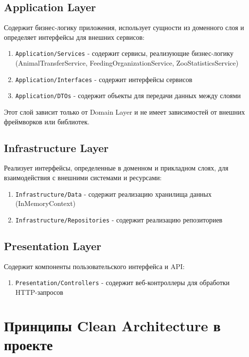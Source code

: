 \documentclass[a4paper,12pt]{article}
\begin{document}
\subsection{Application Layer}

Содержит бизнес-логику приложения, использует сущности из доменного слоя и определяет интерфейсы для внешних сервисов:

\begin{enumerate}
    \item \texttt{Application/Services} - содержит сервисы, реализующие бизнес-логику (AnimalTransferService, FeedingOrganizationService, ZooStatisticsService)
    \item \texttt{Application/Interfaces} - содержит интерфейсы сервисов
    \item \texttt{Application/DTOs} - содержит объекты для передачи данных между слоями
\end{enumerate}

Этот слой зависит только от Domain Layer и не имеет зависимостей от внешних фреймворков или библиотек.

\subsection{Infrastructure Layer}

Реализует интерфейсы, определенные в доменном и прикладном слоях, для взаимодействия с внешними системами и ресурсами:

\begin{enumerate}
    \item \texttt{Infrastructure/Data} - содержит реализацию хранилища данных (InMemoryContext)
    \item \texttt{Infrastructure/Repositories} - содержит реализацию репозиториев
\end{enumerate}

\subsection{Presentation Layer}

Содержит компоненты пользовательского интерфейса и API:

\begin{enumerate}
    \item \texttt{Presentation/Controllers} - содержит веб-контроллеры для обработки HTTP-запросов
\end{enumerate}

\section{Принципы Clean Architecture в проекте}
\end{document}
